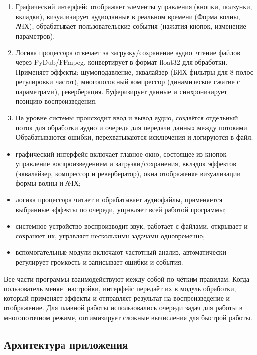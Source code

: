 \begin{enumerate}
	\item Графический интерфейс отображает элементы управления (кнопки, ползунки, вкладки), визуализирует аудиоданные в реальном времени (Форма волны, АЧХ), обрабатывает пользовательские события (нажатия кнопок, изменение параметров).
	\item Логика процессора отвечает за загрузку/сохранение аудио, чтение файлов через PyDub/FFmpeg, конвертирует в формат float32 для обработки. Применяет эффекты: шумоподавление, эквалайзер (БИХ-фильтры для 8 полос регулировки частот), многополосный компрессор (динамическое сжатие с параметрами), реверберация. Буферизирует данные и синхронизирует позицию воспроизведения.
	\item На уровне системы происходит ввод и вывод аудио, создаётся отдельный поток для обработки аудио и очереди для передачи данных между потоками. Обрабатываются ошибки, перехватываются исключения и логируются в файл.
\end{enumerate}

\begin{itemize}
	\item графический интерфейс включает главное окно, состоящее из кнопок управление воспроизведением и загрузки/сохранения, вкладок эффектов (эквалайзер, компрессор и ревербератор), окна отображение визуализации формы волны и АЧХ;
	\item логика процессора читает и обрабатывает аудиофайлы, применяется выбранные эффекты по очереди, управляет всей работой программы;
	\item системное устройство воспроизводит звук, работает с файлами, открывает и сохраняет их, управляет несколькими задачами одновременно;
	\item вспомогательные модули включают частотный анализ, автоматически регулирует громкость и записывает ошибки и события.
\end{itemize}

Все части программы взаимодействуют между собой по чётким правилам. Когда пользователь меняет настройки, интерфейс передаёт их в модуль обработки, который применяет эффекты и отправляет результат на воспроизведение и отображение. Для плавной работы использовались очереди задач для работы в многопоточном режиме, оптимизирует сложные вычисления для быстрой работы.

\subsection{Архитектура приложения}

